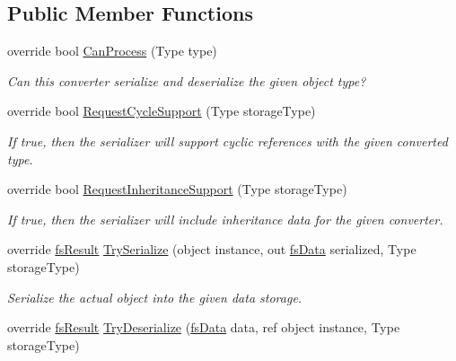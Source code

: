 \subsection*{Public Member Functions}
\begin{DoxyCompactItemize}
\item 
override bool \hyperlink{class_full_serializer_1_1_internal_1_1fs_weak_reference_converter_ac0c327bc319e20e3648e58239ac90888}{Can\+Process} (Type type)
\begin{DoxyCompactList}\small\item\em Can this converter serialize and deserialize the given object type? \end{DoxyCompactList}\item 
override bool \hyperlink{class_full_serializer_1_1_internal_1_1fs_weak_reference_converter_a917bdcf70205871ef02577d31b3216f3}{Request\+Cycle\+Support} (Type storage\+Type)
\begin{DoxyCompactList}\small\item\em If true, then the serializer will support cyclic references with the given converted type. \end{DoxyCompactList}\item 
override bool \hyperlink{class_full_serializer_1_1_internal_1_1fs_weak_reference_converter_a4f8dd86c002f7a3e6b25a1b16d791c60}{Request\+Inheritance\+Support} (Type storage\+Type)
\begin{DoxyCompactList}\small\item\em If true, then the serializer will include inheritance data for the given converter. \end{DoxyCompactList}\item 
override \hyperlink{struct_full_serializer_1_1fs_result}{fs\+Result} \hyperlink{class_full_serializer_1_1_internal_1_1fs_weak_reference_converter_a2faaa58d3ec0a68a9f8aed9e94d92b27}{Try\+Serialize} (object instance, out \hyperlink{class_full_serializer_1_1fs_data}{fs\+Data} serialized, Type storage\+Type)
\begin{DoxyCompactList}\small\item\em Serialize the actual object into the given data storage. \end{DoxyCompactList}\item 
override \hyperlink{struct_full_serializer_1_1fs_result}{fs\+Result} \hyperlink{class_full_serializer_1_1_internal_1_1fs_weak_reference_converter_a0b1b66f55b2e380a0b17f2944dc0ff84}{Try\+Deserialize} (\hyperlink{class_full_serializer_1_1fs_data}{fs\+Data} data, ref object instance, Type storage\+Type)

\end{DoxyCompactItemize}
